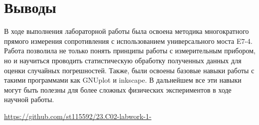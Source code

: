  \newpage


\section{Выводы}
В ходе выполнения лабораторной работы была освоена методика многократного прямого измерения сопротивления с использованием универсального моста E7-4. Работа позволила не только понять принципы работы с измерительным прибором, но и научиться проводить статистическую обработку полученных данных для оценки случайных погрешностей.
Также, были освоены базовые навыки работы с такими программами как GNUplot и inkscape. В дальнейшем все эти навыки могут быть полезны для более сложных физических экспериментов в ходе научной работы. 

\begin{thebibliography}{9}

\url{https://github.com/st115592/23.C02-labwork-1-}  

\end{thebibliography}